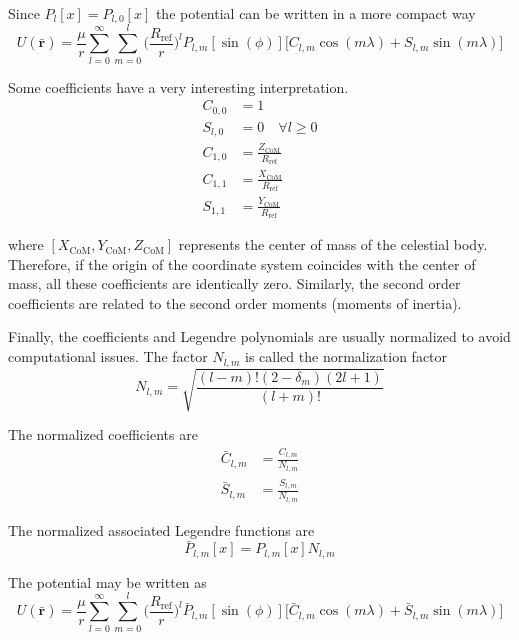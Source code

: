 Since $P_l[x] = P_{l,0}[x]$ the potential can be written in a more compact way
\begin{equation}
U(\mathbf{\bar r}) = \frac{\mu}{r} \sum_{l=0}^\infty \sum_{m=0}^l \bigg(\frac{R_{\text{ref}}}{r}\bigg)^l P_{l,m}[\sin(\phi)] \big[C_{l,m} \cos(m \lambda) + S_{l,m} \sin(m \lambda)\big]
\end{equation}

Some coefficients have a very interesting interpretation.
\begin{align}
	C_{0,0} &= 1\\
	S_{l,0} &= 0 \quad \forall l \geq 0\\
	C_{1,0} &= \frac{Z_{\text{CoM}}}{R_{\text{ref}}}\\
	C_{1,1} &= \frac{X_{\text{CoM}}}{R_{\text{ref}}}\\
	S_{1,1} &= \frac{Y_{\text{CoM}}}{R_{\text{ref}}}
\end{align}

where $[X_\text{CoM}, Y_\text{CoM}, Z_\text{CoM}]$ represents the center of mass of the celestial body. Therefore, if the origin of the coordinate system coincides with the center of mass, all these coefficients are identically zero. Similarly, the second order coefficients are related to the second order moments (moments of inertia).

Finally, the coefficients and Legendre polynomials are usually normalized to avoid computational issues. The factor $N_{l,m}$ is called the normalization factor
\begin{equation}
N_{l,m} = \sqrt{\frac{(l-m)! (2 -\delta_m) (2 l +1)}{(l+m)!}}
\end{equation}

The normalized coefficients are
\begin{align}
	\bar C_{l,m} &= \frac{C_{l,m}}{N_{l,m}}\\
	\bar S_{l,m} &= \frac{S_{l,m}}{N_{l,m}}
\end{align}

The normalized associated Legendre functions are
\begin{equation}
\bar P_{l,m}[x] = P_{l,m}[x] N_{l,m}
\end{equation}

The potential may be written as
\begin{equation}
U(\mathbf{\bar r}) = \frac{\mu}{r} \sum_{l=0}^\infty \sum_{m=0}^l \bigg(\frac{R_{\text{ref}}}{r}\bigg)^l \bar P_{l,m}[\sin(\phi)] \big[\bar C_{l,m} \cos(m \lambda) + \bar S_{l,m} \sin(m \lambda)\big]
\end{equation}

